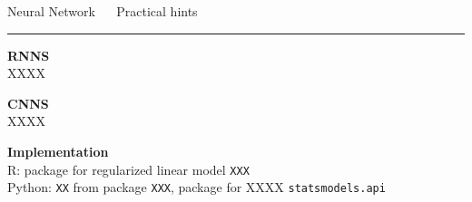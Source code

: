 \documentclass[11pt,compress,t,notes=noshow, xcolor=table]{beamer}
\begin{document}

\LARGE
\begin{frame}{\textcolor{gray!80}{Neural Network} ~~ Practical hints}
\normalsize
\vspace{-0.5cm}
\noindent \textcolor{gray!80}{\rule{\textwidth}{1pt}}

\vspace{0.3cm}

\footnotesize

\lz

  \textbf{\textcolor{gray!80}{RNNS}} \\
  \smallskip
 XXXX
 
 \textbf{\textcolor{gray!80}{CNNS}} \\
  \smallskip
 XXXX
 
 

\lz

  \textbf{\textcolor{gray!80}{Implementation}} \\
  \smallskip
  R: package for regularized linear model \texttt{XXX}\\
  Python: \texttt{XX} from package \texttt{XXX}, package for XXXX \texttt{statsmodels.api}

\end{frame}
\end{document}
